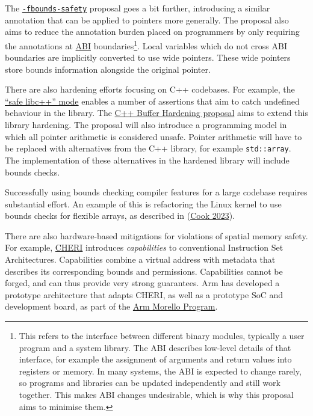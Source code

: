 \documentclass[
  a4paper,
]{report}
\begin{document}
The
\href{https://discourse.llvm.org/t/rfc-enforcing-bounds-safety-in-c-fbounds-safety/70854}{\texttt{-fbounds-safety}}
proposal goes a bit further, introducing a similar annotation that can
be applied to pointers more generally. The proposal also aims to reduce
the annotation burden placed on programmers by only requiring the
annotations at
\href{https://en.wikipedia.org/wiki/Application_binary_interface}{ABI} boundaries\footnote{This refers to the interface
  between different binary modules, typically a user program and a
  system library. The ABI describes low-level details of that interface,
  for example the assignment of arguments and return values into
  registers or memory. In many systems, the ABI is expected to change
  rarely, so programs and libraries can be updated independently and
  still work together. This makes ABI changes undesirable, which is why
  this proposal aims to minimise them.}. Local variables which do not
cross ABI boundaries are implicitly converted to use wide pointers.
These wide pointers store bounds information alongside the original
pointer.

There are also hardening efforts focusing on C++ codebases. For example,
the
\href{https://libcxx.llvm.org/UsingLibcxx.html\#enabling-the-safe-libc-mode}{``safe
libc++'' mode} enables a number of assertions that aim to catch
undefined behaviour in the library. The
\href{https://discourse.llvm.org/t/rfc-c-buffer-hardening/65734}{C++
Buffer Hardening proposal} aims to extend this library hardening. The
proposal will also introduce a programming model in which all pointer
arithmetic is considered unsafe. Pointer arithmetic will have to be
replaced with alternatives from the C++ library, for example
\texttt{std::array}. The implementation of these alternatives in the
hardened library will include bounds checks.

Successfully using bounds checking compiler features for a large
codebase requires substantial effort. An example of this is refactoring
the Linux kernel to use bounds checks for flexible arrays, as described
in (\protect\hyperlink{ref-Cook2023}{Cook 2023}).

There are also hardware-based mitigations for violations of spatial
memory safety. For example,
\href{https://www.cl.cam.ac.uk/research/security/ctsrd/cheri/}{CHERI}
introduces \emph{capabilities} to conventional
Instruction Set Architectures. Capabilities combine a virtual address
with metadata that describes its corresponding bounds and permissions.
Capabilities cannot be forged, and can thus provide very strong
guarantees. Arm has developed a prototype architecture that adapts
CHERI, as well as a prototype SoC and development board, as part of the
\href{https://www.arm.com/architecture/cpu/morello}{Arm Morello
Program}.
\end{document}
